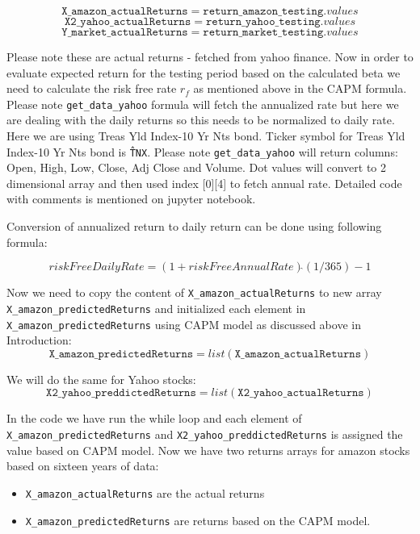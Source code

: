 \indent

$$\texttt{X\_amazon\_actualReturns} = \texttt{return\_amazon\_testing}.values$$
$$\texttt{X2\_yahoo\_actualReturns} = \texttt{return\_yahoo\_testing}.values$$
$$\texttt{Y\_market\_actualReturns} = \texttt{return\_market\_testing}.values$$

\indent

Please note these are actual returns - fetched from yahoo finance. Now in order to evaluate expected return for the testing period based on the calculated beta we need 
to calculate the risk free rate $r_{f}$ as mentioned above in the CAPM formula. Please note \texttt{get\_data\_yahoo} formula will fetch the annualized rate but here we are dealing 
with the daily returns so this needs to be normalized to daily rate. Here we are using Treas Yld Index-10 Yr Nts bond. Ticker symbol for Treas Yld Index-10 Yr Nts bond
is \texttt{\^TNX}. Please note \texttt{get\_data\_yahoo} will return columns: Open, High, Low, Close, Adj Close and Volume. Dot values will convert to 2 dimensional array 
and then used index [0][4] to fetch annual rate. Detailed code with comments is mentioned on jupyter notebook. 

Conversion of annualized return to daily return can be done using following formula:

\indent
$$riskFreeDailyRate = (1+riskFreeAnnualRate) \hat{} (1/365) -1 $$
\indent 

Now we need to copy the content of \texttt{X\_amazon\_actualReturns} to new array \texttt{X\_amazon\_predictedReturns} and initialized each element in \texttt{X\_amazon\_predictedReturns} using 
CAPM model as discussed above in Introduction:
\indent
$$\texttt{X\_amazon\_predictedReturns} = list(\texttt{X\_amazon\_actualReturns})$$

\indent 
We will do the same for Yahoo stocks:
\indent 
$$\texttt{X2\_yahoo\_preddictedReturns} = list(\texttt{X2\_yahoo\_actualReturns})$$
\indent 


In the code we have run the while loop and each element of \texttt{X\_amazon\_predictedReturns} and \texttt{X2\_yahoo\_preddictedReturns} is assigned the value
based on CAPM model. Now we have two returns arrays for amazon stocks based on sixteen years of data: 

\begin{itemize} 
\item \texttt{X\_amazon\_actualReturns} are the actual returns  
\item \texttt{X\_amazon\_predictedReturns} are returns based on the CAPM model. 
\end{itemize}

